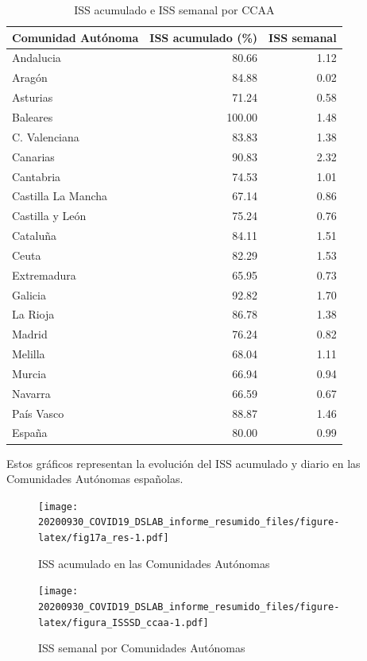 \documentclass[
  11pt,
]{article}
\begin{document}
\begin{table}[!h]

\caption{\label{tab:tabla}ISS acumulado e ISS semanal por CCAA}
\centering
\fontsize{9}{11}\selectfont
\begin{tabular}[t]{l|r|r}
\hline
Comunidad Autónoma & ISS acumulado (\%) & ISS semanal\\
\hline
Andalucia & 80.66 & 1.12\\
\hline
Aragón & 84.88 & 0.02\\
\hline
Asturias & 71.24 & 0.58\\
\hline
Baleares & 100.00 & 1.48\\
\hline
C. Valenciana & 83.83 & 1.38\\
\hline
Canarias & 90.83 & 2.32\\
\hline
Cantabria & 74.53 & 1.01\\
\hline
Castilla La Mancha & 67.14 & 0.86\\
\hline
Castilla y León & 75.24 & 0.76\\
\hline
Cataluña & 84.11 & 1.51\\
\hline
Ceuta & 82.29 & 1.53\\
\hline
Extremadura & 65.95 & 0.73\\
\hline
Galicia & 92.82 & 1.70\\
\hline
La Rioja & 86.78 & 1.38\\
\hline
Madrid & 76.24 & 0.82\\
\hline
Melilla & 68.04 & 1.11\\
\hline
Murcia & 66.94 & 0.94\\
\hline
Navarra & 66.59 & 0.67\\
\hline
País Vasco & 88.87 & 1.46\\
\hline
España & 80.00 & 0.99\\
\hline
\end{tabular}
\end{table}

Estos gráficos representan la evolución del ISS acumulado y diario en
las Comunidades Autónomas españolas.

\vspace{0.2cm}

\begin{figure}
\centering
\texttt{[image: 20200930\_COVID19\_DSLAB\_informe\_resumido\_files/figure-latex/fig17a\_res-1.pdf]}
\caption{\label{fig:fig17a_res} ISS acumulado en las Comunidades
Autónomas}
\end{figure}

\begin{figure}
\centering
\texttt{[image: 20200930\_COVID19\_DSLAB\_informe\_resumido\_files/figure-latex/figura\_ISSSD\_ccaa-1.pdf]}
\caption{\label{fig:figura_ISSSD_ccaa} ISS semanal por Comunidades
Autónomas}
\end{figure}
\end{document}
